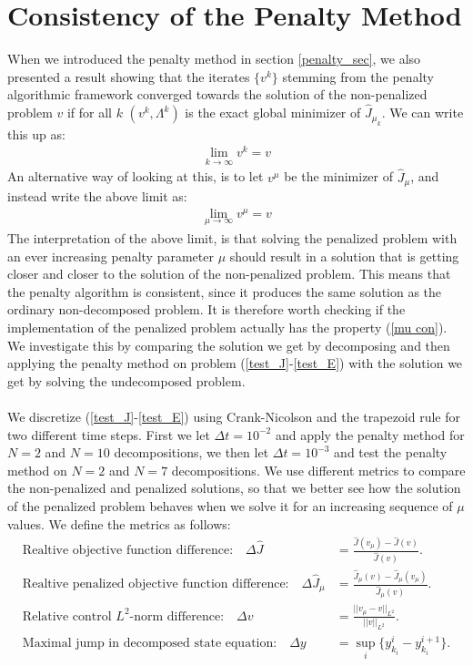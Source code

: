 \section{Consistency of the Penalty Method} \label{consistency_sec}
When we introduced the penalty method in section \ref{penalty_sec}, we also presented a result showing that the iterates $\{v^k\}$ stemming from the penalty algorithmic framework converged towards the solution of the non-penalized problem $v$ if for all $k$ $(v^k,\Lambda^k)$ is the exact global minimizer of $\hat J_{\mu_k}$. We can write this up as:
\begin{align*}
\lim_{k\rightarrow\infty} v^k = v 
\end{align*}  
An alternative way of looking at this, is to let $v^{\mu}$ be the minimizer of $\hat J_{\mu}$, and instead write the above limit as:
\begin{align}
\lim_{\mu\rightarrow\infty} v^{\mu} = v \label{mu con}
\end{align}
The interpretation of the above limit, is that solving the penalized problem with an ever increasing penalty parameter $\mu$ should result in a solution that is getting closer and closer to the solution of the non-penalized problem. This means that the penalty algorithm is consistent, since it produces the same solution as the ordinary non-decomposed problem. It is therefore worth checking if the implementation of the penalized problem actually has the property (\ref{mu con}). We investigate this by comparing the solution we get by decomposing and then applying the penalty method on problem (\ref{test_J}-\ref{test_E}) with the solution we get by solving the undecomposed problem. 
\\
\\
We discretize (\ref{test_J}-\ref{test_E}) using Crank-Nicolson and the trapezoid rule for two different time steps. First we let $\Delta t = 10^{-2}$ and apply the penalty method for $N=2$ and $N=10$ decompositions, we then let $\Delta t = 10^{-3}$ and test the penalty method on $N=2$ and $N=7$ decompositions. We use different metrics to compare the non-penalized and penalized solutions, so that we better see how the solution of the penalized problem behaves when we solve it for an increasing sequence of $\mu$ values. We define the metrics as follows:
\begin{align}
\textrm{Realtive objective function difference:}\quad \Delta \hat J &= \frac{\hat{J}(v_{\mu})-\hat{J}(v)}{\hat{J}(v)}.\label{mes1}\\
\textrm{Realtive penalized objective function difference:}\quad \Delta \hat J_{\mu} &= \frac{\hat{J}_{\mu}(v)-\hat{J}_{\mu}(v_{\mu})}{\hat{J}_{\mu}(v)}.\\
\textrm{Relative control $L^2$-norm difference:}\quad \Delta v&=\frac{||v_{\mu}-v||_ {L^2}}{||v||_{L^2}}. \\
\textrm{Maximal jump in decomposed state equation:}\quad \Delta y&= \sup_i\{y_{k_i}^i-y_{k_i}^{i+1}\}.\label{mes4}
\end{align}
